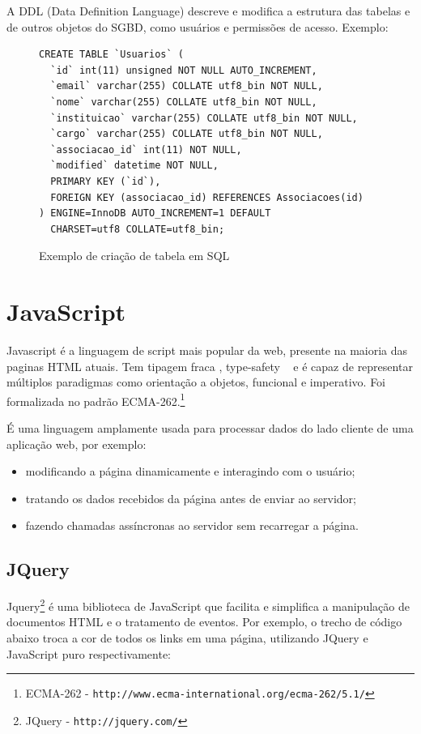 \par A DDL (Data Definition Language) descreve e modifica a estrutura das tabelas e de outros objetos do SGBD, como usuários e permissões de acesso. Exemplo:

\begin{figure}[H]
\begin{verbatim}
CREATE TABLE `Usuarios` (
  `id` int(11) unsigned NOT NULL AUTO_INCREMENT,
  `email` varchar(255) COLLATE utf8_bin NOT NULL,
  `nome` varchar(255) COLLATE utf8_bin NOT NULL,
  `instituicao` varchar(255) COLLATE utf8_bin NOT NULL,
  `cargo` varchar(255) COLLATE utf8_bin NOT NULL,
  `associacao_id` int(11) NOT NULL,
  `modified` datetime NOT NULL,
  PRIMARY KEY (`id`),
  FOREIGN KEY (associacao_id) REFERENCES Associacoes(id)
) ENGINE=InnoDB AUTO_INCREMENT=1 DEFAULT 
  CHARSET=utf8 COLLATE=utf8_bin;
\end{verbatim}
\caption{Exemplo de criação de tabela em SQL}
\label{lst:sql_ddl}
\end{figure} 

\section{JavaScript}
Javascript é a linguagem de script mais popular da web, presente na maioria das paginas HTML atuais. Tem tipagem fraca , type-safety ~\cite{plai} e é capaz de representar múltiplos paradigmas como orientação a objetos, funcional e imperativo. Foi formalizada no padrão ECMA-262.\footnote{ECMA-262 - \texttt{http://www.ecma-international.org/ecma-262/5.1/}}
\par
É uma linguagem amplamente usada para processar dados do lado cliente de uma aplicação web, por exemplo:
\begin{itemize}
\item  modificando a página dinamicamente e interagindo com o usuário;
\item  tratando os dados recebidos da página antes de enviar ao servidor;
\item  fazendo chamadas assíncronas ao servidor sem recarregar a página.
\end{itemize}


\subsection{JQuery}
\label{sub:jq}
Jquery\footnote{JQuery - \texttt{http://jquery.com/}} é uma biblioteca de JavaScript que facilita e simplifica a manipulação de documentos HTML e o tratamento de eventos. Por exemplo, o trecho de código abaixo troca a cor de todos os links em uma página, utilizando JQuery e JavaScript puro respectivamente:

